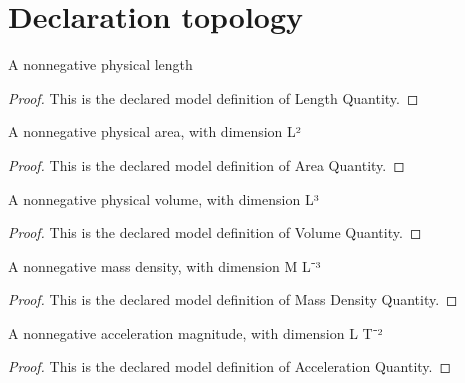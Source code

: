 \section{Declaration topology}
\begin{definition}
  \label{def:physics:phyx-mini-0723:phyxminiproblems-problemphyxmini0723-lengthquantity}
  A nonnegative physical length
\end{definition}
\begin{proof}
  This is the declared model definition of Length Quantity.
\end{proof}
\begin{definition}
  \label{def:physics:phyx-mini-0723:phyxminiproblems-problemphyxmini0723-areaquantity}
  A nonnegative physical area, with dimension L²
\end{definition}
\begin{proof}
  This is the declared model definition of Area Quantity.
\end{proof}
\begin{definition}
  \label{def:physics:phyx-mini-0723:phyxminiproblems-problemphyxmini0723-volumequantity}
  A nonnegative physical volume, with dimension L³
\end{definition}
\begin{proof}
  This is the declared model definition of Volume Quantity.
\end{proof}
\begin{definition}
  \label{def:physics:phyx-mini-0723:phyxminiproblems-problemphyxmini0723-massdensityquantity}
  A nonnegative mass density, with dimension M L⁻³
\end{definition}
\begin{proof}
  This is the declared model definition of Mass Density Quantity.
\end{proof}
\begin{definition}
  \label{def:physics:phyx-mini-0723:phyxminiproblems-problemphyxmini0723-accelerationquantity}
  A nonnegative acceleration magnitude, with dimension L T⁻²
\end{definition}
\begin{proof}
  This is the declared model definition of Acceleration Quantity.
\end{proof}
